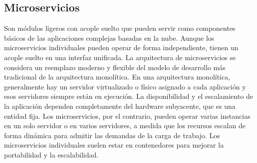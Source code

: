 \documentclass[12pt]{article}
\begin{document}
\subsection*{Microservicios}
Son módulos ligeros con acople suelto que pueden servir como componentes básicos de las aplicaciones complejas basadas en la nube. Aunque los microservicios individuales pueden operar de forma independiente, tienen un acople suelto en una interfaz unificada.
La arquitectura de microservicios se considera un reemplazo moderno y flexible del modelo de desarrollo más tradicional de la arquitectura monolítica.
En una arquitectura monolítica, generalmente hay un servidor virtualizado o físico asignado a cada aplicación y esos servidores siempre están en ejecución. La disponibilidad y el escalamiento de la aplicación dependen completamente del hardware subyacente, que es una entidad fija.
Los microservicios, por el contrario, pueden operar varias instancias en un solo servidor o en varios servidores, a medida que los recursos escalan de forma dinámica para admitir las demandas de la carga de trabajo. Los microservicios individuales suelen estar en contenedores para mejorar la portabilidad y la escalabilidad.
\end{document}
